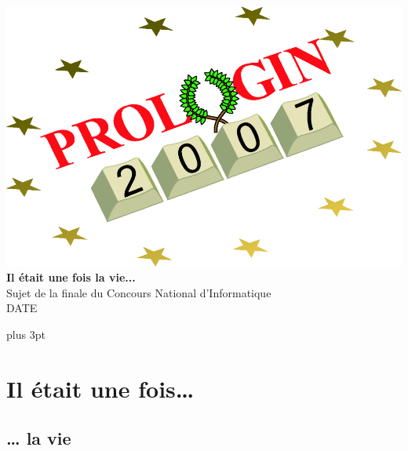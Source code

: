 \documentclass[a4paper,twoside,12pt]{article}
\begin{document}
\pagestyle{empty}
\sloppy

\lhead[\thepage]{\nouppercase \leftmark}
\cfoot{}

\begin{titlepage}
\begin{center}
\includegraphics[width=\linewidth]{logo}\\
\vspace{4cm}
\Huge
\textbf{Il \'etait une fois la vie...}\\
\vspace{2cm}
\normalsize
Sujet de la finale du Concours National d'Informatique\\
DATE\\
\end{center}
\end{titlepage}

\cleardoublepage
\tableofcontents

\cleardoublepage
\setcounter{page}{1}
\pagestyle{fancy}
\parskip=6pt plus 3pt

\section{Il \'etait une fois\ldots} %

\subsection{\ldots{} la vie}
\end{document}
